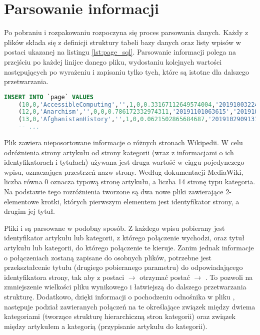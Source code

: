 \section{Parsowanie informacji}
\label{sec:data-parsing}
Po pobraniu i rozpakowaniu rozpoczyna się proces parsowania danych. Każdy z plików  składa się z definicji struktury tabeli bazy danych oraz listy wpisów w postaci ukazanej na listingu \ref{lst:page_sql}. Parsowanie informacji polega na przejściu po każdej linijce danego pliku, wydostaniu kolejnych wartości następujących po wyrażeniu  i zapisaniu tylko tych, które są istotne dla dalszego przetwarzania.

\begin{lstlisting}[language=SQL,frame=single,caption={Fragment pliku enwiki-20191101-page.sql zawierający dane o stronach},label=lst:page_sql]
INSERT INTO `page` VALUES
    (10,0,'AccessibleComputing','',1,0,0.33167112649574004,'20191003224230','20190105021557',854851586,94,'wikitext',NULL),
    (12,0,'Anarchism','',0,0,0.786172332974311,'20191101063615','20191031183024',923631615,104479,'wikitext',NULL),
    (13,0,'AfghanistanHistory','',1,0,0.0621502865684687,'20191029091312','20190618192734',783865149,90,'wikitext',NULL),
    -- ...
\end{lstlisting}

Plik  zawiera nieposortowane informacje o różnych stronach Wikipedii. W celu odróżnienia strony artykułu od strony kategorii (wraz z informacjami o ich identyfikatorach i tytułach) używana jest druga wartość w ciągu pojedynczego wpisu, oznaczająca przestrzeń nazw strony. Według dokumentacji MediaWiki, liczba równa 0 oznacza typową stronę artykułu, a liczba 14 stronę typu kategoria. Na podstawie tego rozróżnienia tworzone są dwa nowe pliki zawierające 2-elementowe krotki, których pierwszym elementem jest identyfikator strony, a drugim jej tytuł.

Pliki  i  są parsowane w podobny sposób. Z każdego wpisu pobierany jest identyfikator artykułu lub kategorii, z którego połączenie wychodzi, oraz tytuł artykułu lub kategorii, do którego połączenie te kieruje. Zanim jednak informacje o połączeniach zostaną zapisane do osobnych plików, potrzebne jest przekształcenie tytułu (drugiego pobieranego parametru) do odpowiadającego identyfikatora strony, tak aby z postaci  \(\rightarrow\)  otrzymać postać  \(\rightarrow\) . To pozwoli na zmniejszenie wielkości pliku wynikowego i łatwiejszą do dalszego przetwarzania strukturę. Dodatkowo, dzięki informacji o pochodzeniu odnośnika w pliku , następuje podział zawieranych połączeń na te określające związek między dwiema kategoriami (tworzące strukturę hierarchiczną stron kategorii) oraz związek między artykułem a kategorią (przypisanie artykułu do kategorii).

